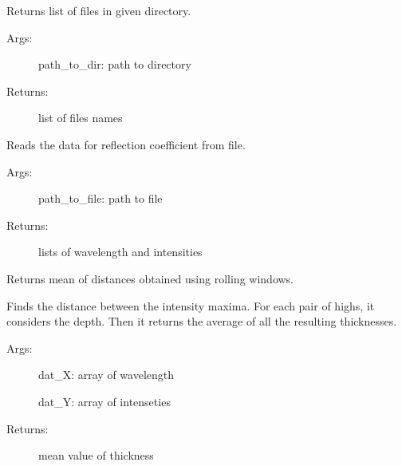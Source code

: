 \documentclass[letterpaper,10pt,english]{sphinxmanual}
\begin{document}
\begin{fulllineitems}
\label{\detokenize{GUI:GUI.get_files_list}}
Returns list of files in given directory.
\begin{description}
\item[{Args:}] \leavevmode
path\_to\_dir: path to directory

\item[{Returns:}] \leavevmode
list of files names

\end{description}

\end{fulllineitems}


\begin{fulllineitems}
\label{\detokenize{GUI:GUI.refection_coef_read}}
Reads the data for reflection coefficient from file.
\begin{description}
\item[{Args:}] \leavevmode
path\_to\_file: path to file

\item[{Returns:}] \leavevmode
lists of wavelength and intensities

\end{description}

\end{fulllineitems}


\begin{fulllineitems}
\label{\detokenize{GUI:GUI.rolling_dist}}
Returns mean of distances obtained using rolling windows.

Finds the distance between the intensity maxima. For each pair of highs,
it considers the depth. Then it returns the average of all the resulting 
thicknesses.
\begin{description}
\item[{Args:}] \leavevmode
dat\_X: array of wavelength

dat\_Y: array of intenseties

\item[{Returns:}] \leavevmode
mean value of thickness

\end{description}

\end{fulllineitems}
\end{document}
